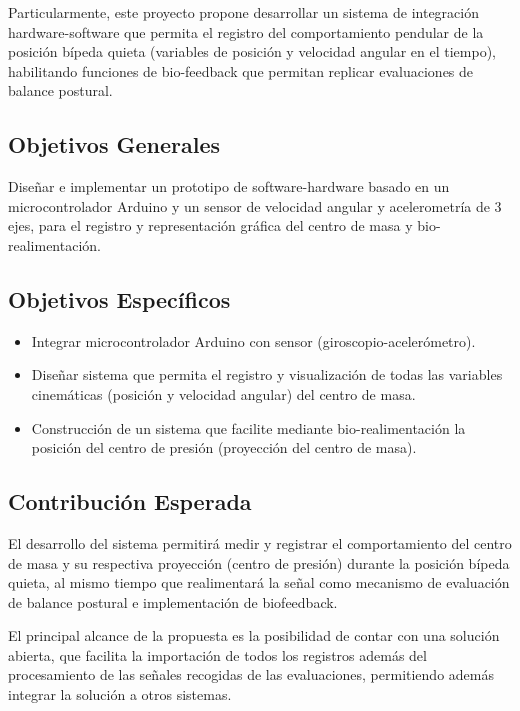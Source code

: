 \documentclass[12pt,a4paper]{article}
\begin{document}
			Particularmente, este proyecto propone desarrollar un sistema de integración hardware-software que permita el registro del comportamiento pendular de la posición bípeda quieta (variables de posición y velocidad angular en el tiempo), habilitando funciones de bio-feedback que permitan replicar evaluaciones de balance postural.
			
			\subsection{Objetivos Generales}
			Diseñar e implementar un prototipo de software-hardware basado en un microcontrolador Arduino y un sensor de velocidad angular y acelerometría de 3 ejes, para el registro y representación gráfica del centro de masa y bio-realimentación.
			
			\subsection{Objetivos Específicos}
			\begin{itemize}
				\item Integrar microcontrolador Arduino con sensor (giroscopio-acelerómetro).
				\item Diseñar sistema que permita el registro y visualización de todas las variables cinemáticas (posición y velocidad angular) del centro de masa. 
				\item Construcción de un sistema que facilite mediante bio-realimentación la posición del centro de presión (proyección del centro de masa).
			\end{itemize}	
			
			\subsection{Contribución Esperada}
			
			El desarrollo del sistema permitirá medir y registrar el comportamiento del centro de masa y su respectiva proyección (centro de presión) durante la posición bípeda quieta, al mismo tiempo que realimentará la señal como mecanismo de evaluación de balance postural e implementación de biofeedback.
			
			El principal alcance de la propuesta es la posibilidad de contar con una solución abierta, que facilita la importación de todos los registros además del procesamiento de las señales recogidas de las evaluaciones, permitiendo además integrar la solución a otros sistemas.
			
\end{document}
